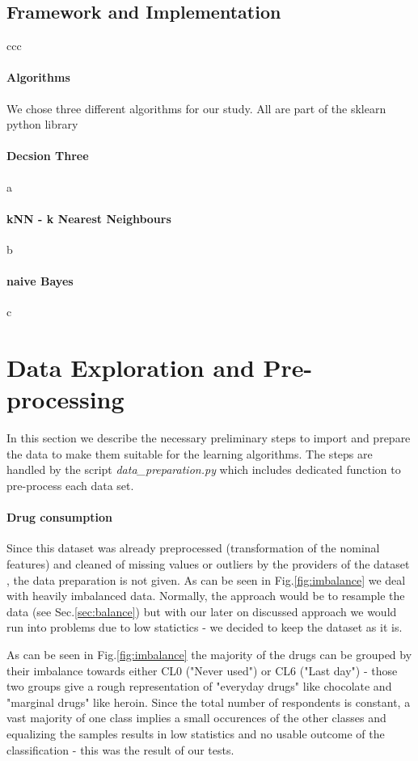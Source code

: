 \documentclass{article}
\begin{document}
\subsection{Framework and Implementation}
ccc

\paragraph{Algorithms}
We chose three different algorithms for our study. All are part of the sklearn python library
\paragraph{Decsion Three} a
\paragraph{kNN - k Nearest Neighbours} b
\paragraph{naive Bayes} c

\section{Data Exploration and Pre-processing}
In this section we describe the necessary preliminary steps to import and prepare the data to make them suitable for the learning algorithms.
The steps are handled by the script \textit{data\_preparation.py} which includes dedicated function to pre-process each data set.

\paragraph{Drug consumption}
Since this dataset was already preprocessed (transformation of the nominal features) and cleaned of missing values or outliers by the providers of the dataset \cite{fehrman2017factor}, the data preparation is not given. As can be seen in Fig.\ref{fig:imbalance} we deal with heavily imbalanced data. Normally, the approach would be to resample the data (see Sec.\ref{sec:balance}) but with our later on discussed approach we would run into problems due to low statictics - we decided to keep the dataset as it is.

 As can be seen in Fig.\ref{fig:imbalance} the majority of the drugs can be grouped by their imbalance towards either CL0 ("Never used") or CL6 ("Last day") - those two groups give a rough representation of "everyday drugs" like chocolate and "marginal drugs" like heroin. Since the total number of respondents is constant, a vast majority of one class implies a small occurences of the other classes and equalizing the samples results in low statistics and no usable outcome of the classification - this was the result of our tests. \\
\end{document}

